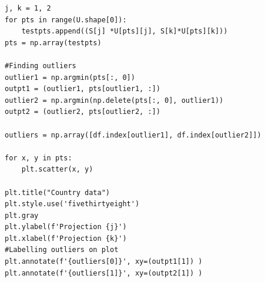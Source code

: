 \begin{solution}
\begin{lstlisting}
j, k = 1, 2
for pts in range(U.shape[0]):
    testpts.append((S[j] *U[pts][j], S[k]*U[pts][k]))
pts = np.array(testpts)

#Finding outliers
outlier1 = np.argmin(pts[:, 0])
outpt1 = (outlier1, pts[outlier1, :])
outlier2 = np.argmin(np.delete(pts[:, 0], outlier1))
outpt2 = (outlier2, pts[outlier2, :])

outliers = np.array([df.index[outlier1], df.index[outlier2]])

for x, y in pts:
    plt.scatter(x, y)
    
plt.title("Country data")
plt.style.use('fivethirtyeight')
plt.gray
plt.ylabel(f'Projection {j}')
plt.xlabel(f'Projection {k}')
#Labelling outliers on plot
plt.annotate(f'{outliers[0]}', xy=(outpt1[1]) )
plt.annotate(f'{outliers[1]}', xy=(outpt2[1]) )
\end{lstlisting}
\end{solution}


\newpage
